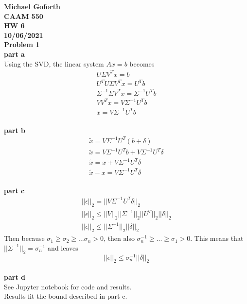 \documentclass{article} %
\begin{document}
\textbf{Michael Goforth} \\
\textbf{CAAM 550} \\
\textbf{HW 6} \\
\textbf{10/06/2021} \\ 

\textbf{Problem 1} \\
\textbf{part a} \\
Using the SVD, the linear system $Ax=b$ becomes
\begin{align*}
U\Sigma V^T x = b \\
U^T U \Sigma V^T x = U^T b\\
\Sigma^{-1} \Sigma V^T x = \Sigma^{-1} U^T b \\
V V^T x = V \Sigma^{-1} U^T b \\
x = V \Sigma^{-1} U^T b \\
\end{align*}

\textbf{part b} \\
\begin{align*}
\tilde{x} = V \Sigma^{-1} U^T (b + \delta) \\
\tilde{x} = V \Sigma^{-1} U^T b + V \Sigma^{-1} U^T \delta \\
\tilde{x} = x + V \Sigma^{-1} U^T \delta \\
\tilde{x} - x = V \Sigma^{-1} U^T \delta \\
\end{align*}

\textbf{part c} \\
\begin{align*}
||\epsilon||_2 = ||V \Sigma^{-1} U^T \delta||_2 \\
||\epsilon||_2 \leq ||V||_2 ||\Sigma^{-1}||_2 ||U^T||_2 ||\delta||_2 \\
||\epsilon||_2 \leq ||\Sigma^{-1}||_2 ||\delta||_2 
\end{align*}
Then because $\sigma_1 \geq \sigma_2 \geq \ldots \sigma_n > 0$, then also $\sigma_n^{-1} \geq ... \geq \sigma_1 > 0$.  This means that $||\Sigma^{-1}||_2 = \sigma_n^{-1}$ and leaves
\begin{equation*}
||\epsilon||_2 \leq \sigma_n^{-1} ||\delta||_2
\end{equation*}
\\

\textbf{part d} \\
See Jupyter notebook for code and results. \\
Results fit the bound described in part c.
\\
\\
\end{document}
